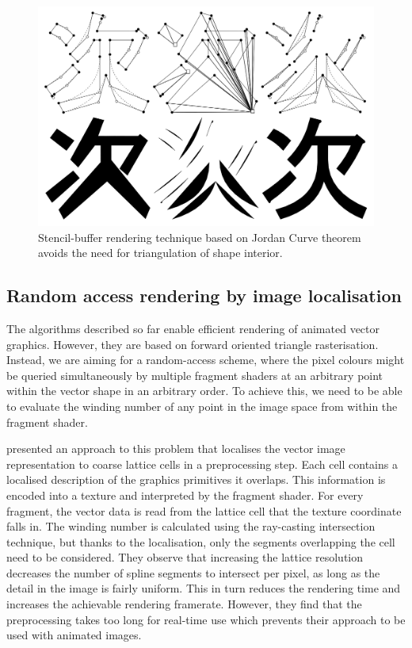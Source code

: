 \documentclass[11pt,a4paper,twoside]{article}
\begin{document}
\begin {figure}
	\centering
	\includegraphics [width=0.5\columnwidth] {figures/kokojima}
	\caption {Stencil-buffer rendering technique based on Jordan Curve theorem avoids the need for triangulation of shape interior.}
	\label {fig:kokojima}
\end {figure}

\subsection {Random access rendering by image localisation}

The algorithms described so far enable efficient rendering of animated vector graphics. However, they are based on forward oriented triangle rasterisation. Instead, we are aiming for a random-access scheme, where the pixel colours might be queried simultaneously by multiple fragment shaders at an arbitrary point within the vector shape in an arbitrary order. To achieve this, we need to be able to evaluate the winding number of any point in the image space from within the fragment shader.

\cite{NehabHoppe08} presented an approach to this problem that localises the vector image representation to coarse lattice cells in a preprocessing step. Each cell contains a localised description of the graphics primitives it overlaps. This information is encoded into a texture and interpreted by the fragment shader. For every fragment, the vector data is read from the lattice cell that the texture coordinate falls in. The winding number is calculated using the ray-casting intersection technique, but thanks to the localisation, only the segments overlapping the cell need to be considered. They observe that increasing the lattice resolution decreases the number of spline segments to intersect per pixel, as long as the detail in the image is fairly uniform. This in turn reduces the rendering time and increases the achievable rendering framerate. However, they find that the preprocessing takes too long for real-time use which prevents their approach to be used with animated images.
\end{document}
